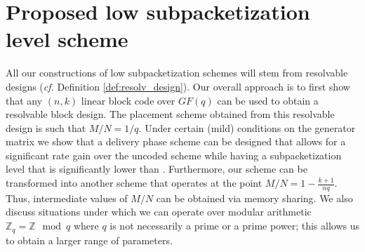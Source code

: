 \documentclass[journal,twocolumn]{IEEEtran}
\theoremstyle{definition}
\begin{document}
\section{Proposed low subpacketization level scheme}
 \label{sec:design}
	

%

All our constructions of low subpacketization schemes will stem from resolvable designs ({\it cf.} Definition \ref{def:resolv_design}). Our overall approach is to first show that any $(n,k)$ linear block code over $GF(q)$ can be used to obtain a resolvable block design. The placement scheme obtained from this resolvable design is such that $M/N = 1/q$. Under certain (mild) conditions on the generator matrix we show that a delivery phase scheme can be designed that allows for a significant rate gain over the uncoded scheme while having a subpacketization level that is significantly lower than \cite{maddahN14}. Furthermore, our scheme can be transformed into another scheme that operates at the point $M/N = 1 - \frac{k+1}{nq}$. Thus, intermediate values of $M/N$ can be obtained via memory sharing. We also discuss situations under which we can operate over modular arithmetic $\mathbb Z_q = \mathbb{Z} \mod q$ where $q$ is not necessarily a prime or a prime power; this allows us to obtain a larger range of parameters.
\end{document}
